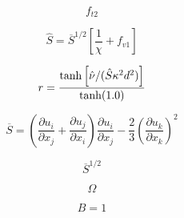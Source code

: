 

\begin{equation}
f_{t2}
\end{equation}

\begin{equation}
\hat S = \overline S^{1/2} \left[ \frac{1}{\chi} + f_{v1} \right]
\end{equation}

\begin{equation}
r = \frac{{\rm tanh} \left[ \hat \nu/(\hat S \kappa^2 d^2)\right]}{{\rm tanh}(1.0)}
\end{equation}

\begin{equation}
\overline S= \left( \frac{\partial u_i}{\partial x_j} + \frac{\partial u_j}{\partial x_i} \right)
   \frac{\partial u_i}{\partial x_j} - \frac{2}{3} 
   \left( \frac{\partial u_k}{\partial x_k} \right)^2
\end{equation}

\begin{equation}
\overline S^{1/2}
\end{equation}

\begin{equation}
\Omega
\end{equation}

\begin{equation}
B=1
\end{equation}


